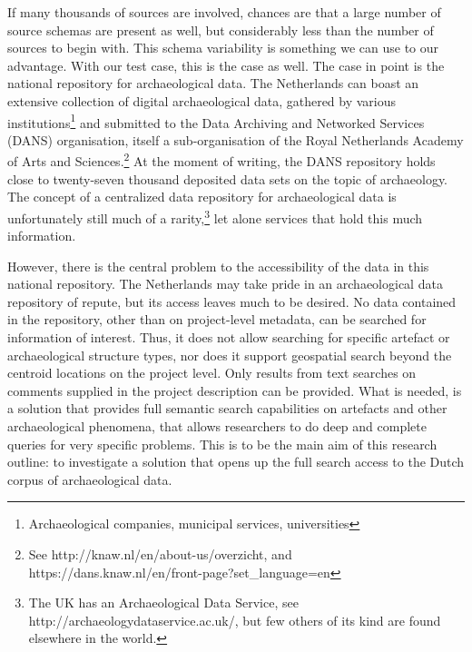 \documentclass[12pt,twoside,a4paper]{article}
\begin{document}
If many thousands of sources are involved, chances are that a large number of source schemas are present as well, but considerably less than the number of sources to begin with. This schema variability is something we can use to our advantage. With our test case, this is the case as well. 
The case in point is the national repository for archaeological data. The Netherlands can boast an extensive collection of digital archaeological data, gathered by various institutions\footnote{Archaeological companies, municipal services, universities} and submitted to the Data Archiving and Networked Services (DANS) organisation, itself a sub-organisation of the Royal Netherlands Academy of Arts and Sciences.\footnote{See http://knaw.nl/en/about-us/overzicht, and https://dans.knaw.nl/en/front-page?set\_language=en} At the moment of writing, the DANS repository holds close to twenty-seven thousand deposited data sets on the topic of archaeology. 
The concept of a centralized data repository for archaeological data is unfortunately still much of a rarity,\footnote{The UK has an Archaeological Data Service, see http://archaeologydataservice.ac.uk/, but few others of its kind are found elsewhere in the world.} let alone services that hold this much information.

However, there is the central problem to the accessibility of the data in this national repository. 
The Netherlands may take pride in an archaeological data repository of repute, but its access leaves much to be desired. No data contained in the repository, other than on project-level metadata, can be searched for information of interest. Thus, it does not allow searching for specific artefact or archaeological structure types, nor does it support geospatial search beyond the centroid locations on the project level. Only results from text searches on comments supplied in the project description can be provided. What is needed, is a solution that provides full semantic search capabilities on artefacts and other archaeological phenomena, that allows researchers to do deep and complete queries for very specific problems. This is to be the main aim of this research outline: to investigate a solution that opens up the full search access to the Dutch corpus of archaeological data.
\end{document}
